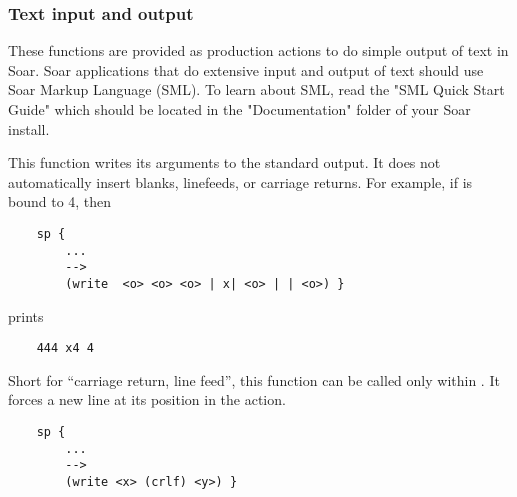 \subdivider
\subsubsection*{Text input and output}

These functions are provided as production actions to do simple output of text in Soar. Soar applications that do extensive input and output of text should use Soar Markup Language (SML). To learn about SML, read the "SML Quick Start Guide" which should be located in the "Documentation"  folder of your Soar install.

 
\begin{description}
	
\item [\soarb{write} --- ] 
	This function writes its arguments to the standard output. It does not automatically insert blanks, linefeeds, or carriage returns.  For example, if  is bound to 4, then
	
	\begin{verbatim}
	sp {
	    ...
	    -->
	    (write  <o> <o> <o> | x| <o> | | <o>) }
	\end{verbatim}
	
	prints
	
	\begin{verbatim}
	444 x4 4
	\end{verbatim}

\item [\soarb{crlf} --- ] 
	Short for ``carriage return, line feed'', this function can be called only within . It forces a new line at its position in the  action. 
	
	\begin{verbatim}
	sp {
	    ...
	    -->
	    (write <x> (crlf) <y>) }
	\end{verbatim}




\end{description}
